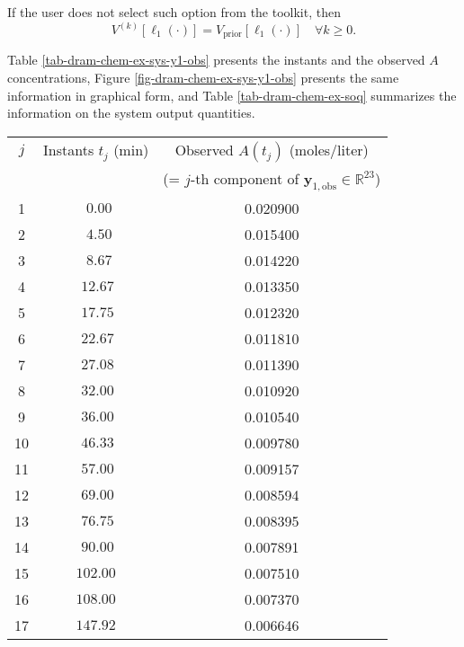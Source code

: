 If the user does not select such option from the toolkit, then
\begin{equation*}
V^{(k)}[\ell_1(\cdot)] = V_{\text{prior}}[\ell_1(\cdot)]\quad\forall k\geqslant 0.
\end{equation*}

Table \ref{tab-dram-chem-ex-sys-y1-obs} presents the instants and the observed $A$ concentrations,
Figure \ref{fig-dram-chem-ex-sys-y1-obs} presents the same information in graphical form, and
Table \ref{tab-dram-chem-ex-soq} summarizes the information on the system output quantities.

\begin{table}[h!]
\begin{center}
\begin{tabular}{|c|c|c|}
\hline
$j$ & Instants $t_j$ (min) & Observed $A(t_j)$ (moles/liter)                                       \\
    &                      & (= $j$-th component of $\mathbf{y}_{1,\text{obs}}\in\mathbb{R}^{23}$) \\
\hline
\hline
 1  & $~~0.00$             & 0.020900  \\
\hline
 2  & $~~4.50$             & 0.015400  \\
\hline
 3  & $~~8.67$             & 0.014220  \\
\hline
 4  & $~12.67$             & 0.013350  \\
\hline
 5  & $~17.75$             & 0.012320  \\
\hline
 6  & $~22.67$             & 0.011810  \\
\hline
 7  & $~27.08$             & 0.011390  \\
\hline
 8  & $~32.00$             & 0.010920  \\
\hline
 9  & $~36.00$             & 0.010540  \\
\hline
10  & $~46.33$             & 0.009780  \\
\hline
11  & $~57.00$             & 0.009157 \\
\hline
12  & $~69.00$             & 0.008594 \\
\hline
13  & $~76.75$             & 0.008395 \\
\hline
14  & $~90.00$             & 0.007891 \\
\hline
15  & $102.00$             & 0.007510 \\
\hline
16  & $108.00$             & 0.007370 \\
\hline
17  & $147.92$             & 0.006646 \\

\end{tabular}
\end{center}
\end{table}
